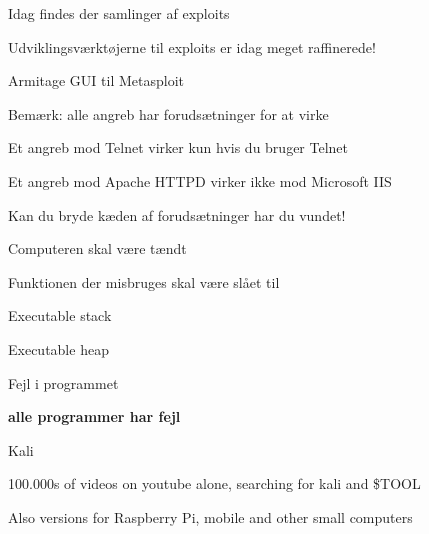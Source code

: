 \documentclass[Screen16to9,17pt]{foils}
\begin{document}

\centerline{}



\begin{list1}
\item Idag findes der samlinger af exploits
\item Udviklingsværktøjerne til exploits er idag meget raffinerede!
\item {}
\item {} Armitage GUI til Metasploit
\item {}
\end{list1}



\begin{list1}
\item Bemærk: alle angreb har forudsætninger for at virke
\item Et angreb mod Telnet virker kun hvis du bruger Telnet
\item Et angreb mod Apache HTTPD virker ikke mod Microsoft IIS
\item Kan du bryde kæden af forudsætninger har du vundet!
\end{list1}



\begin{list1}
\item Computeren skal være tændt
\item Funktionen der misbruges skal være slået til
\item Executable stack
\item Executable heap
\item Fejl i programmet
\end{list1}
\pause
\vskip 2cm

\centerline{\color{titlecolor}\LARGE \bf alle programmer har fejl}




\begin{list1}
\item  Kali 
\item 100.000s of videos on youtube alone, searching for kali and \$TOOL
\item Also versions for Raspberry Pi, mobile and other small computers
\end{list1}
\end{document}
